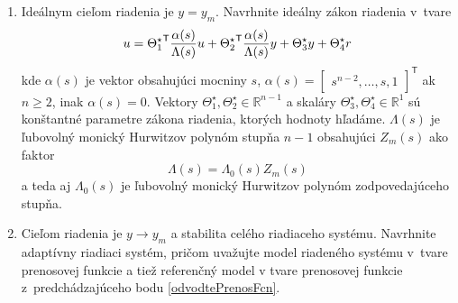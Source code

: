 ﻿\documentclass[a4paper, 10pt, ]{article}
\begin{document}
\begin{enumerate}
\begin{enumerate}
		\item Ideálnym cieľom riadenia je $y = y_m$. Navrhnite ideálny zákon riadenia v~tvare
		\begin{equation*}
			u
			=
			{\Theta_1^\star}^{\mathsf{T}}
			\frac{\alpha(s)}{\Lambda(s)}
			u
			+
			{\Theta_2^\star}^{\mathsf{T}}
			\frac{\alpha(s)}{\Lambda(s)}
			y
			+
			\Theta_3^\star
			y
			+
			\Theta_4^\star
			r
		\end{equation*}
		kde $\alpha(s)$ je vektor obsahujúci mocniny $s$, $\alpha(s) = \begin{bmatrix} s^{n-2}, \ldots,s, 1 \end{bmatrix}^{\mathsf{T}}$ ak $n\geq 2$, inak $\alpha(s) = 0$. Vektory $\Theta_1^\star, \Theta_2^\star \in \mathbb{R}^{n-1}$ a  skaláry $\Theta_3^\star, \Theta_4^\star \in \mathbb{R}^1$ sú konštantné parametre zákona riadenia, ktorých hodnoty hľadáme.  $\Lambda(s)$ je ľubovolný monický Hurwitzov polynóm stupňa $n-1$ obsahujúci $Z_m(s)$ ako faktor
		\begin{equation*}
			\Lambda(s) = \Lambda_0(s) Z_m(s)
		\end{equation*}
		a teda aj $\Lambda_0(s)$ je ľubovolný monický Hurwitzov polynóm zodpovedajúceho stupňa.

		\item Cieľom riadenia je $y \to y_m$ a stabilita celého riadiaceho systému. Navrhnite adaptívny riadiaci systém, pričom uvažujte model riadeného systému v~tvare prenosovej funkcie  a tiež referenčný model v tvare prenosovej funkcie z~predchádzajúceho bodu \ref{odvodtePrenosFcn}.

	\end{enumerate}
\end{enumerate}











{}

\end{document}
